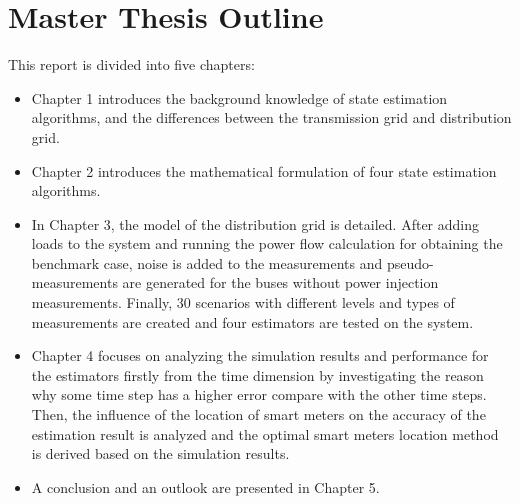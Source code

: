 \section{Master Thesis Outline}
This report is divided into five chapters:
\begin{itemize}
    \item Chapter 1 introduces the background knowledge of state estimation algorithms, and the differences between the transmission grid and distribution grid. 
    \item Chapter 2 introduces the mathematical formulation of four state estimation algorithms.
    \item In Chapter 3, the model of the distribution grid is detailed. After adding loads to the system and running the power flow calculation for obtaining the benchmark case, noise is added to the measurements and pseudo-measurements are generated for the buses without power injection measurements. Finally, 30 scenarios with different levels and types of measurements are created and four estimators are tested on the system.
    \item Chapter 4 focuses on analyzing the simulation results and performance for the estimators firstly from the time dimension by investigating the reason why some time step has a higher error compare with the other time steps. Then, the influence of the location of smart meters on the accuracy of the estimation result is analyzed and the optimal smart meters location method is derived based on the simulation results.
    \item A conclusion and an outlook are presented in Chapter 5. 
    
\end{itemize}

\newpage

